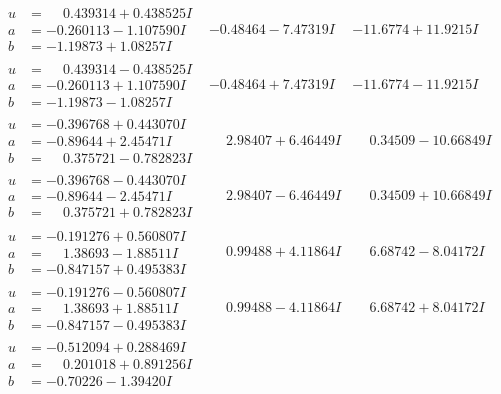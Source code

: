 \documentclass[1p]{elsarticle_modified}
\theoremstyle{definition}
\begin{document}
$$\begin{array}{c|c|c}
 \hline 
\begin{aligned}
u &= \phantom{-}0.439314 + 0.438525 I \\
a &= -0.260113 - 1.107590 I \\
b &= -1.19873 + 1.08257 I\end{aligned}
 & -0.48464 - 7.47319 I & -11.6774 + 11.9215 I \\ \hline\begin{aligned}
u &= \phantom{-}0.439314 - 0.438525 I \\
a &= -0.260113 + 1.107590 I \\
b &= -1.19873 - 1.08257 I\end{aligned}
 & -0.48464 + 7.47319 I & -11.6774 - 11.9215 I \\ \hline\begin{aligned}
u &= -0.396768 + 0.443070 I \\
a &= -0.89644 + 2.45471 I \\
b &= \phantom{-}0.375721 - 0.782823 I\end{aligned}
 & \phantom{-}2.98407 + 6.46449 I & \phantom{-}0.34509 - 10.66849 I \\ \hline\begin{aligned}
u &= -0.396768 - 0.443070 I \\
a &= -0.89644 - 2.45471 I \\
b &= \phantom{-}0.375721 + 0.782823 I\end{aligned}
 & \phantom{-}2.98407 - 6.46449 I & \phantom{-}0.34509 + 10.66849 I \\ \hline\begin{aligned}
u &= -0.191276 + 0.560807 I \\
a &= \phantom{-}1.38693 - 1.88511 I \\
b &= -0.847157 + 0.495383 I\end{aligned}
 & \phantom{-}0.99488 + 4.11864 I & \phantom{-}6.68742 - 8.04172 I \\ \hline\begin{aligned}
u &= -0.191276 - 0.560807 I \\
a &= \phantom{-}1.38693 + 1.88511 I \\
b &= -0.847157 - 0.495383 I\end{aligned}
 & \phantom{-}0.99488 - 4.11864 I & \phantom{-}6.68742 + 8.04172 I \\ \hline\begin{aligned}
u &= -0.512094 + 0.288469 I \\
a &= \phantom{-}0.201018 + 0.891256 I \\
b &= -0.70226 - 1.39420 I\end{aligned}

\end{array}$$
\end{document}
